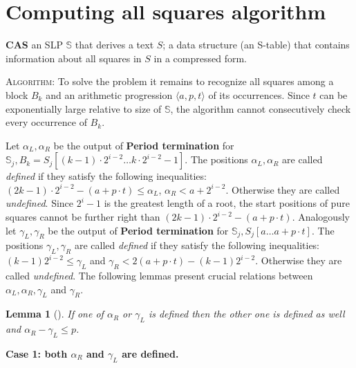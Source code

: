 \documentclass[10pt]{article}
\newtheorem{lem}[thm]{Lemma}
\newcommand{\prog}[3]{\langle #1, #2, #3\rangle}
\newcommand{\slp}[1]{\mathbb{#1}}
\newcommand{\substr}[2]{[#1\dots#2]}
\newcommand{\problem}[3]{
            \noindent {\sc Problem:} \textbf{#1} \newline
            \noindent {\sc Input:} #2 \newline
            \noindent {\sc Output:} #3
}
\begin{document}
\section{Computing all squares algorithm}

\problem{CAS}{an SLP $\slp{S}$ that derives a text $S$;}{a data structure (an S-table) that contains
information about all squares in $S$ in a compressed form.}

\noindent \textsc{Algorithm:} To solve the problem it remains to recognize all squares among a block $B_k$ and an
arithmetic progression $\prog{a}{p}{t}$ of its occurrences. Since $t$ can be exponentially large relative to
size of $\slp{S}$, the algorithm cannot consecutively check every occurrence of $B_k$.

Let $\alpha_L, \alpha_R$ be the output of \textbf{Period termination} for $\slp{S}_j, B_k = 
S_j\substr{(k-1)\cdot2^{i-2}}{k\cdot 2^{i-2} -1}$. The positions $\alpha_L, \alpha_R$ are called \emph{defined} if they satisfy the
following inequalities: $(2k-1)\cdot2^{i-2} - (a + p\cdot t) \leq \alpha_L$, $\alpha_R < a + 2^{i-2}$.
Otherwise they are called \emph{undefined}. Since $2^{i} - 1$ is the greatest length of a root, the start
positions of pure squares cannot be further right than $(2k-1)\cdot2^{i-2} - (a + p\cdot t)$. Analogously let $\gamma_L, \gamma_R$ be the output of
\textbf{Period termination} for $\slp{S}_j, S_j\substr{a}{a + p\cdot t}$. The positions $\gamma_L, \gamma_R$ are called
\emph{defined} if they satisfy the following inequalities: $(k-1)2^{i-2} \leq \gamma_L$ and $\gamma_R < 2(a + p\cdot
t) - (k-1)2^{i-2}$. Otherwise they are called \emph{undefined}. The following lemmas present crucial relations between 
$\alpha_L, \alpha_R, \gamma_L$ and $\gamma_R$.

\begin{lem}[{\rm\cite{2}}]
If one of $\alpha_R$ or $\gamma_L$ is defined then the other one is defined as well and $\alpha_R - \gamma_L \leq p$.
\end{lem}

\noindent \textbf{Case 1: both {\boldmath $\alpha_R$} and {\boldmath $\gamma_L$} are defined.} 
\end{document}
